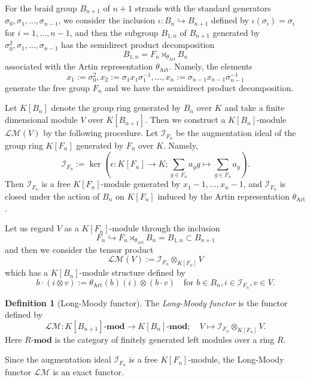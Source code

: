 \documentclass[a4paper,12pt]{article}
\theoremstyle{definition}
\newtheorem{df}[thm]{Definition}
\theoremstyle{remark}
\begin{document}
For the braid group $B_{n+1}$ of $n+1$ strands
with the standard generators $\sigma_{0},\sigma_{1},\ldots,\sigma_{n-1}$,
we consider the inclusion $\iota\colon B_{n}\hookrightarrow B_{n+1}$ defined by 
$\iota(\sigma_{i})=\sigma_{i}$ for $i=1,\ldots,n-1$, and 
then the subgroup $B_{1,n}$ of $B_{n+1}$
generated by $\sigma_{0}^{2},\sigma_{1},\ldots,\sigma_{n-1}$ has 
the 
semidirect product decomposition 
\[
	B_{1,n} = F_{n}\rtimes_{\theta_{\mathrm{Art}}}B_{n}
\]
associated with the Artin representation $\theta_{\mathrm{Art}}$.
Namely, the elements
\[
x_{1}:=\sigma_{0}^{2}, x_{2}:=\sigma_{1}x_{1}\sigma_{1}^{-1},
\ldots, x_{n}:=\sigma_{n-1}x_{n-1}\sigma_{n-1}^{-1}
\]
generate the free group $F_{n}$ and 
we have the semidirect product decomposition.

Let $K[B_{n}]$ denote the group ring generated by $B_{n}$ over $K$
and take a finite dimensional module $V$ over $K[B_{n+1}]$. 
Then we construct a $K[B_{n}]$-module $\mathcal{LM}(V)$ by the following procedure.
Let $\mathcal{I}_{F_{n}}$ be the augmentation ideal of the group ring $K[F_{n}]$ generated by $F_{n}$ over $K$. Namely,
\[
	\mathcal{I}_{F_{n}} := \ker\left(\epsilon\colon K[F_{n}]\to K; \sum_{g\in F_{n}}a_{g}g\mapsto \sum_{g\in F_{n}}a_{g}\right).
\]
Then $\mathcal{I}_{F_{n}}$ is a free $K[F_{n}]$-module 
generated by $x_{1}-1,\ldots,x_{n}-1$, and 
$\mathcal{I}_{F_{n}}$ is closed under 
the action of $B_{n}$ on $K[F_{n}]$ induced	by the Artin representation $\theta_{\mathrm{Art}}$.

Let us regard $V$ as a $K[F_{n}]$-module
through the inclusion 
\[F_{n}\hookrightarrow 
F_{n}\rtimes_{\theta_{\mathrm{Art}}}B_{n}=B_{1,n}\subset B_{n+1}\]
and
then we consider the tensor product 
\[
\mathcal{LM}(V):=\mathcal{I}_{F_{n}}\otimes_{K[F_{n}]}V
\]
which has a $K[B_{n}]$-module structure defined  by
\[
	b\cdot (i\otimes v):=\theta_{\mathrm{Art}}(b)(i)\otimes (b\cdot v)
	\quad \text{for $b\in B_{n}, i\in \mathcal{I}_{F_{n}}, v\in V$}.
\]
\begin{df}[Long-Moody functor]\label{df:longmoody}
	The \emph{Long-Moody functor} is
	the functor defined by 
	\[
		\mathcal{LM}\colon K[B_{n+1}]\text{-}\mathrm{\mathbf{mod}}\to K[B_{n}]\text{-}\mathrm{\mathbf{mod}}; \quad V\mapsto \mathcal{I}_{F_{n}}\otimes_{K[F_{n}]}V.
	\] 
	Here $R\text{-}\mathrm{\mathbf{mod}}$ is the category of finitely generated left modules over a ring $R$.
\end{df}	
Since the augmentation ideal $\mathcal{I}_{F_{n}}$ is a free $K[F_{n}]$-module,
the Long-Moody functor $\mathcal{LM}$ is an exact functor.
\end{document}
